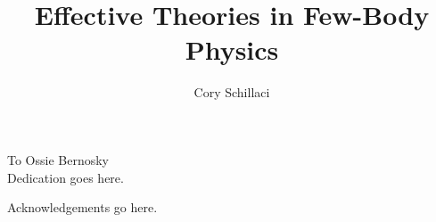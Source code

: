 \documentclass{ucbthesis}
\begin{document}

\title{Effective Theories in Few-Body Physics}
\author{Cory Schillaci}


\maketitle
\approvalpage
\copyrightpage



\begin{frontmatter}

\begin{dedication}
\null\vfil
\begin{center}
To Ossie Bernosky\\\vspace{12pt}
Dedication goes here.
\end{center}
\vfil\null
\end{dedication}


\tableofcontents
\clearpage
\listoffigures
\clearpage
\listoftables

\begin{acknowledgements}
Acknowledgements go here.

\end{acknowledgements}

\end{frontmatter}

\pagestyle{headings}


%



\appendix


\printbibliography
\end{document}
